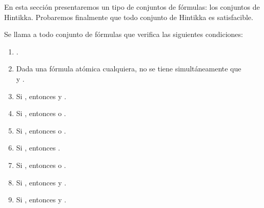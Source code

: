 %
\begin{isabellebody}%
%
%
\isadelimtheory
%
\endisadelimtheory
%
\isatagtheory
%
\endisatagtheory
{\isafoldtheory}%
%
\isadelimtheory
%
\endisadelimtheory
%
\isadelimdocument
%
\endisadelimdocument
%
\isatagdocument
%
\isamarkuptrue%
%
\endisatagdocument
{\isafolddocument}%
%
\isadelimdocument
%
\endisadelimdocument
%
\begin{isamarkuptext}%
En esta sección presentaremos un tipo de conjuntos de fórmulas:
  los conjuntos de Hintikka. Probaremos finalmente que todo conjunto 
  de Hintikka es satisfacible.

  \begin{definicion}
  Se llama  a todo conjunto de fórmulas  que
  verifica las siguientes condiciones:
    \begin{enumerate}
      \item {}.
      \item Dada  una fórmula atómica cualquiera, no se tiene 
        simultáneamente que\\  y .
      \item Si , entonces  y .
      \item Si , entonces  o .
      \item Si , entonces  o .
      \item Si , entonces .
      \item Si , entonces  o .
      \item Si , entonces  y . 
      \item Si , entonces  y . 
    \end{enumerate}  
  \end{definicion}


\end{isamarkuptext}
\end{isabellebody}
